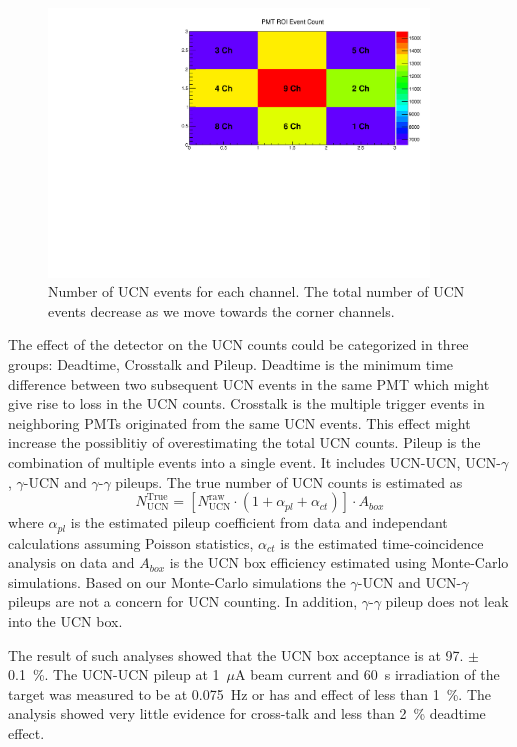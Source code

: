 \begin{figure}[h!]
  \centering
  \includegraphics[width=0.9\textwidth]{channelcounts.pdf}
  \caption{Number of UCN events for each channel. The total number of
    UCN events decrease as we move towards the corner channels.  }
  \label{fig:channelcounts}
\end{figure}


The effect of the detector on the UCN counts could be categorized in
three groups: Deadtime, Crosstalk and Pileup. Deadtime is the minimum
time difference between two subsequent UCN events in the same PMT
which might give rise to loss in the UCN counts. Crosstalk is the
multiple trigger events in neighboring PMTs originated from the same
UCN events. This effect might increase the possiblitiy of
overestimating the total UCN counts. Pileup is the combination of
multiple events into a single event. It includes UCN-UCN,
UCN-$\gamma$, $\gamma$-UCN and $\gamma$-$\gamma$ pileups. The true
number of UCN counts is estimated as
\begin{equation}
  \label{eqn:trueUCN}
  N^{\mathrm{True}}_{\mathrm{UCN}} = \left [ N^{\mathrm{raw}}_{\mathrm{UCN}} \cdot \left( 1 + \alpha_{pl} + \alpha_{ct}\right) \right] \cdot A_{box}
\end{equation}
where $\alpha_{pl}$ is the estimated pileup coefficient from data and
independant calculations assuming Poisson statistics, $\alpha_{ct}$ is
the estimated time-coincidence analysis on data and $A_{box}$ is the
UCN box efficiency estimated using Monte-Carlo simulations. Based on
our Monte-Carlo simulations the $\gamma$-UCN and UCN-$\gamma$ pileups
are not a concern for UCN counting. In addition, $\gamma$-$\gamma$
pileup does not leak into the UCN box.

The result of such analyses showed that the UCN box acceptance is at
97. $\pm$ 0.1~\%. The UCN-UCN pileup at 1~$\mu$A beam current and 60~s
irradiation of the target was measured to be at 0.075~Hz or has and
effect of less than 1~\%. The analysis showed very little evidence for
cross-talk and less than 2~\% deadtime effect.



